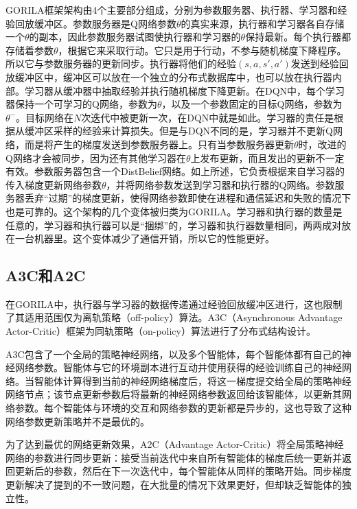 GORILA框架架构由4个主要部分组成，分别为参数服务器、执行器、学习器和经验回放缓冲区。参数服务器是Q网络参数$\theta$的真实来源，执行器和学习器各自存储一个$\theta$的副本，因此参数服务器试图使执行器和学习器的$\theta$保持最新。每个执行器都存储着参数$\theta$，根据它来采取行动。它只是用于行动，不参与随机梯度下降程序。所以它与参数服务器的更新同步。执行器将他们的经验$(s,a,s',a')$发送到经验回放缓冲区中，缓冲区可以放在一个独立的分布式数据库中，也可以放在执行器内部。学习器从缓冲器中抽取经验并执行随机梯度下降更新。在DQN中，每个学习器保持一个可学习的Q网络，参数为$\theta$，以及一个参数固定的目标Q网络，参数为$\theta^-$。目标网络在$N$次迭代中被更新一次，在DQN中就是如此。学习器的责任是根据从缓冲区采样的经验来计算损失。但是与DQN不同的是，学习器并不更新Q网络，而是将产生的梯度发送到参数服务器上。只有当参数服务器更新$\theta$时，改进的Q网络才会被同步，因为还有其他学习器在$\theta$上发布更新，而且发出的更新不一定有效。参数服务器包含一个DistBelief网络。如上所述，它负责根据来自学习器的传入梯度更新网络参数$\theta$，并将网络参数发送到学习器和执行器的Q网络。参数服务器丢弃“过期”的梯度更新，使得网络参数即使在进程和通信延迟和失败的情况下也是可靠的。这个架构的几个变体被归类为GORILA。学习器和执行器的数量是任意的，学习器和执行器可以是“捆绑”的，学习器和执行器数量相同，两两成对放在一台机器里。这个变体减少了通信开销，所以它的性能更好。

\subsection{A3C和A2C}

在GORILA中，执行器与学习器的数据传递通过经验回放缓冲区进行，这也限制了其适用范围仅为离轨策略（off-policy）算法。A3C（Asynchronous Advantage Actor-Critic）\cite{mnih2016asynchronous}框架为同轨策略（on-policy）算法进行了分布式结构设计。

A3C包含了一个全局的策略神经网络，以及多个智能体，每个智能体都有自己的神经网络参数。智能体与它的环境副本进行互动并使用获得的经验训练自己的神经网络。当智能体计算得到当前的神经网络梯度后，将这一梯度提交给全局的策略神经网络节点；该节点更新参数后将最新的神经网络参数返回给该智能体，以更新其网络参数。每个智能体与环境的交互和网络参数的更新都是异步的，这也导致了这种网络参数更新策略并不是最优的。

为了达到最优的网络更新效果，A2C（Advantage Actor-Critic）将全局策略神经网络的参数进行同步更新：接受当前迭代中来自所有智能体的梯度后统一更新并返回更新后的参数，然后在下一次迭代中，每个智能体从同样的策略开始。同步梯度更新解决了提到的不一致问题，在大批量的情况下效果更好，但却缺乏智能体的独立性。

